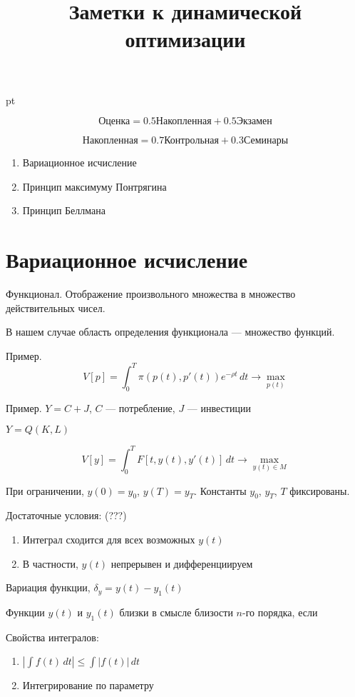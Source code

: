 \documentclass[pdftex,12pt,a4paper]{article}
\title{Заметки к динамической оптимизации}
\begin{document}
 pt %


\[
\text{Оценка}=0.5\text{Накопленная}+0.5\text{Экзамен}
\]

\[
\text{Накопленная}=0.7\text{Контрольная}+0.3\text{Семинары}
\]

\begin{enumerate}
\item Вариационное исчисление
\item Принцип максимуму Понтрягина
\item Принцип Беллмана
\end{enumerate}


\section{Вариационное исчисление}

Функционал. Отображение произвольного множества в множество действительных чисел. 


В нашем случае область определения функционала --- множество функций.


Пример. 
\[
V[p]=\int_0^T \pi(p(t),p'(t))e^{-\rho t}\,dt \to \max_{p(t)}
\]

Пример. $Y=C+J$, $C$ --- потребление, $J$ --- инвестиции

$Y=Q(K,L)$



\[
V[y]=\int_0^T F[t,y(t),y'(t)] \,dt \to \max_{y(t)\in M}
\]

При ограничении, $y(0)=y_0$, $y(T)=y_T$. Константы $y_0$, $y_T$, $T$ фиксированы.


Достаточные условия:
(???)
\begin{enumerate}
\item Интеграл сходится для всех возможных $y(t)$
\item В частности, $y(t)$ непрерывен и дифференциируем
\end{enumerate}


Вариация функции, $\delta_y=y(t)-y_1(t)$


Функции $y(t)$ и $y_1(t)$ близки в смысле близости $n$-го порядка, если 



Свойства интегралов:

\begin{enumerate}
\item $| \int f(t)\,dt| \leq \int |f(t)| \, dt$
\item Интегрирование по параметру
\end{enumerate}
\end{document}
